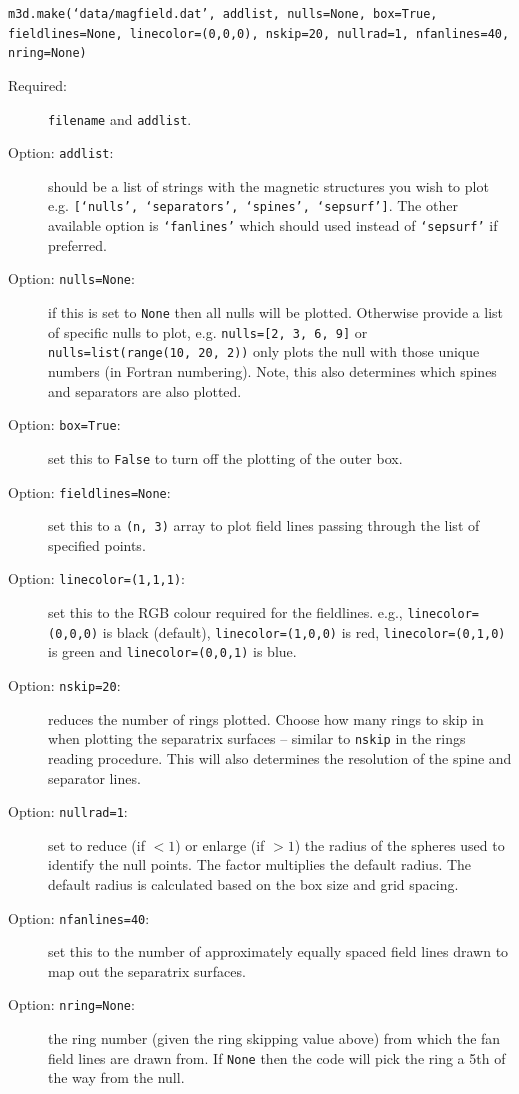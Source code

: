 \documentclass[12pt]{article}
\begin{document}
      \texttt{m3d.make(`data/magfield.dat', addlist, nulls=None, box=True, fieldlines=None, linecolor=(0,0,0), nskip=20, nullrad=1, nfanlines=40, nring=None)}

      \begin{description}
        \item [Required:] \texttt{filename} and \texttt{addlist}.
        \item [Option: \texttt{addlist}:] should be a list of strings with the magnetic structures you wish to plot e.g. \texttt{[`nulls', `separators', `spines', `sepsurf']}. The other available option is \texttt{`fanlines'} which should used instead of \texttt{`sepsurf'} if preferred.
        \item [Option: \texttt{nulls=None}:] if this is set to \texttt{None} then all nulls will be plotted. Otherwise provide a list of specific nulls to plot, e.g. \texttt{nulls=[2, 3, 6, 9]} or \texttt{nulls=list(range(10, 20, 2))} only plots the null with those unique numbers (in Fortran numbering). Note, this also determines which spines and separators are also plotted.
        \item [Option: \texttt{box=True}:] set this to \texttt{False} to turn off the plotting of the outer box.
        \item [Option: \texttt{fieldlines=None}:] set this to a \texttt{(n, 3)} array to plot field lines passing through the list of specified points.
        \item [Option: \texttt{linecolor=(1,1,1)}:] set this to the RGB colour required for the fieldlines. e.g., \texttt{linecolor=(0,0,0)} is black (default),  \texttt{linecolor=(1,0,0)} is red, \texttt{linecolor=(0,1,0)} is green and \texttt{linecolor=(0,0,1)} is blue.
        \item [Option: \texttt{nskip=20}:] reduces the number of rings plotted. Choose how many rings to skip in when plotting the separatrix surfaces -- similar to \texttt{nskip} in the rings reading procedure. This will also determines the resolution of the spine and separator lines.
        \item [Option: \texttt{nullrad=1}:] set to reduce (if $<1$) or enlarge (if $>1$) the radius of the spheres used to identify the null points. The factor multiplies the default radius. The default radius is calculated based on the box size and grid spacing.
        \item [Option: \texttt{nfanlines=40}:] set this to the number of approximately equally spaced field lines drawn to map out the separatrix surfaces.
        \item [Option: \texttt{nring=None}:] the ring number (given the ring skipping value above) from which the fan field lines are drawn from. If \texttt{None} then the code will pick the ring a 5th of the way from the null.
      \end{description}
\end{document}
